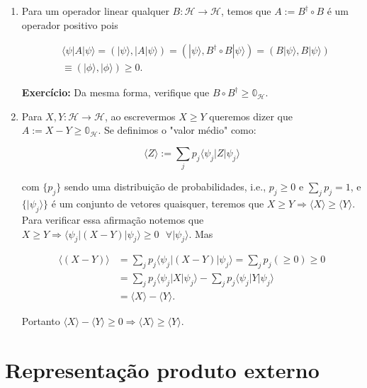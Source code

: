 \documentclass[11pt]{article}
\providecommand{\tightlist}{%
      \setlength{\itemsep}{0pt}\setlength{\parskip}{0pt}}
\begin{document}
\begin{enumerate}
\def\labelenumi{\arabic{enumi}.}
\setcounter{enumi}{1}
\tightlist
\item
  Para um operador linear qualquer
  \(B:\mathcal{H}\rightarrow\mathcal{H}\), temos que
  \(A:=B^{\dagger}\circ B\) é um operador positivo pois

  \begin{align}
  & \langle \psi|A|\psi\rangle = (|\psi\rangle,|A|\psi\rangle) = (|\psi\rangle,B^{\dagger}\circ B|\psi\rangle) = (B|\psi\rangle,B|\psi\rangle) \\
  & \equiv (|\phi\rangle,|\phi\rangle) \ge0.
  \end{align}

  \textbf{Exercício:} Da mesma forma, verifique que
  \(B\circ B^{\dagger}\ge\mathbb{0}_{\mathcal{H}}\).
\item
  Para \(X,Y:\mathcal{H}\rightarrow\mathcal{H}\), ao escrevermos
  \(X\ge Y\) queremos dizer que \(A:=X-Y\ge\mathbb{0}_{\mathcal{H}}\).
  Se definimos o "valor médio" como:

  \begin{equation}
  \langle Z\rangle:=\sum_{j}p_{j}\langle\psi_{j}|Z|\psi_{j}\rangle
  \end{equation}

  com \(\{p_{j}\}\) sendo uma distribuição de probabilidades, i.e.,
  \(p_{j}\ge 0\) e \(\sum_{j}p_{j}=1\), e \(\{|\psi_{j}\rangle\}\) é um
  conjunto de vetores quaisquer, teremos que
  \(X\ge Y\Rightarrow\langle X\rangle\ge\langle Y\rangle\). Para
  verificar essa afirmação notemos que
  \(X\ge Y\Rightarrow\langle\psi_{j}|( X- Y)|\psi_{j}\rangle\ge 0 \text{ }\forall |\psi_{j}\rangle\).
  Mas

  \begin{align}
  \langle (X- Y)\rangle & = \sum_{j}p_{j}\langle\psi_{j}|( X- Y)|\psi_{j}\rangle = \sum_{j}p_{j}(\ge 0) \ge 0 \\
  & = \sum_{j}p_{j}\langle\psi_{j}|X|\psi_{j}\rangle - \sum_{j}p_{j}\langle\psi_{j}|Y|\psi_{j}\rangle \\
  & = \langle X\rangle - \langle Y\rangle.
  \end{align}

  Portanto
  \(\langle X\rangle - \langle Y\rangle\ge 0\Rightarrow\langle X\rangle \ge \langle Y\rangle\).
\end{enumerate}

    \section{Representação produto
externo}\label{representauxe7uxe3o-produto-externo}
\end{document}
